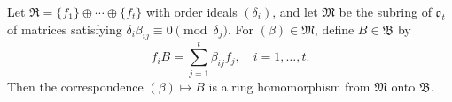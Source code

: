 Let $\mathfrak{R} = \{f_1\} \oplus \cdots \oplus \{f_t\}$ with order ideals $(\delta_i)$, and let $\mathfrak{M}$ be the subring of $\mathfrak{o}_t$ of matrices satisfying $\delta_i \beta_{ij} \equiv 0 \pmod{\delta_j}$. For $(\beta) \in \mathfrak{M}$, define $B \in \mathfrak{B}$ by
$$f_i B = \sum_{j=1}^{t} \beta_{ij} f_j, \quad i = 1, \ldots, t.$$
Then the correspondence $(\beta) \mapsto B$ is a ring homomorphism from $\mathfrak{M}$ onto $\mathfrak{B}$.

